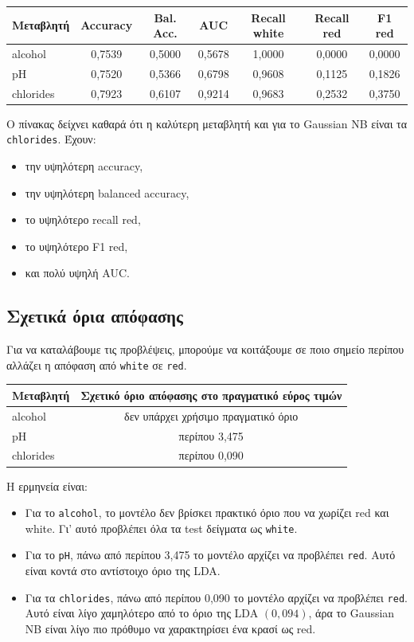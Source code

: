 \documentclass[11pt,a4paper]{article}
\newcommand{\code}[1]{\texttt{#1}}
\begin{document}
\begin{center}
\begin{tabular}{lcccccc}
\toprule
Μεταβλητή & Accuracy & Bal. Acc. & AUC & Recall white & Recall red & F1 red \\
\midrule
alcohol & 0,7539 & 0,5000 & 0,5678 & 1,0000 & 0,0000 & 0,0000 \\
pH & 0,7520 & 0,5366 & 0,6798 & 0,9608 & 0,1125 & 0,1826 \\
chlorides & 0,7923 & 0,6107 & 0,9214 & 0,9683 & 0,2532 & 0,3750 \\
\bottomrule
\end{tabular}
\end{center}

Ο πίνακας δείχνει καθαρά ότι η καλύτερη μεταβλητή και για το Gaussian NB είναι
τα \code{chlorides}. Έχουν:
\begin{itemize}
    \item την υψηλότερη accuracy,
    \item την υψηλότερη balanced accuracy,
    \item το υψηλότερο recall red,
    \item το υψηλότερο F1 red,
    \item και πολύ υψηλή AUC.
\end{itemize}

\subsection{Σχετικά όρια απόφασης}

Για να καταλάβουμε τις προβλέψεις, μπορούμε να κοιτάξουμε σε ποιο σημείο
περίπου αλλάζει η απόφαση από \code{white} σε \code{red}.

\begin{center}
\begin{tabular}{lc}
\toprule
Μεταβλητή & Σχετικό όριο απόφασης στο πραγματικό εύρος τιμών \\
\midrule
alcohol & δεν υπάρχει χρήσιμο πραγματικό όριο \\
pH & περίπου 3,475 \\
chlorides & περίπου 0,090 \\
\bottomrule
\end{tabular}
\end{center}

Η ερμηνεία είναι:
\begin{itemize}
    \item Για το \code{alcohol}, το μοντέλο δεν βρίσκει πρακτικό όριο που να
    χωρίζει red και white. Γι' αυτό προβλέπει όλα τα test δείγματα ως
    \code{white}.

    \item Για το \code{pH}, πάνω από περίπου 3,475 το μοντέλο αρχίζει να
    προβλέπει \code{red}. Αυτό είναι κοντά στο αντίστοιχο όριο της LDA.

    \item Για τα \code{chlorides}, πάνω από περίπου 0,090 το μοντέλο αρχίζει
    να προβλέπει \code{red}. Αυτό είναι λίγο χαμηλότερο από το όριο της LDA
    \((0{,}094)\), άρα το Gaussian NB είναι λίγο πιο πρόθυμο να χαρακτηρίσει
    ένα κρασί ως red.
\end{itemize}
\end{document}
